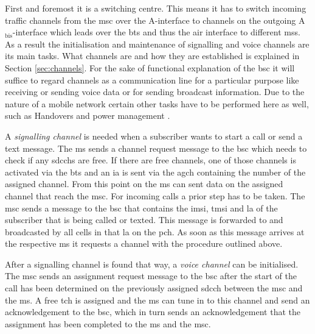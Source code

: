 First and foremost it is a switching centre.
This means it has to switch incoming traffic channels from the \gls{msc} over the A-interface to channels on the outgoing A$_\text{bis}$-interface which leads over the \gls{bts} and thus the air interface to different \glspl{ms}.
As a result the initialisation and maintenance of signalling and voice channels are its main tasks.
What channels are and how they are established is explained in Section \ref{sec:channels}.
For the sake of functional explanation of the \gls{bsc} it will suffice to regard channels as a communication line for a particular purpose like receiving or sending voice data or  for sending broadcast information.
Due to the nature of a mobile network certain other tasks have to be performed here as well, such as Handovers and power management \cite{kommsys2006}.

A \emph{signalling channel} is needed when a subscriber wants to start a call or send a text message.
The \gls{ms} sends a channel request message to the \gls{bsc} which needs to check if any \glspl{sdcch} are free.
If there are free channels, one of those channels is activated via the \gls{bts} and an \gls{ia} is sent via the \gls{agch} containing the number of the assigned channel.
From this point on the \gls{ms} can sent data on the assigned channel that reach the \gls{msc}.
For incoming calls a prior step has to be taken.
The \gls{msc} sends a message to the \gls{bsc} that contains the \gls{imsi}, \gls{tmsi} and \gls{la} of the subscriber that is being called or texted.
This message is forwarded to and broadcasted by all cells in that \gls{la} on the \gls{pch}.
As soon as this message arrives at the respective \gls{ms} it requests a channel with the procedure outlined above.

After a signalling channel is found that way, a \emph{voice channel} can be initialised.
The \gls{msc} sends an assignment request message to the \gls{bsc} after the start of the call has been determined on the previously assigned \gls{sdcch} between the \gls{msc} and the \gls{ms}.
A free \gls{tch} is assigned and the \gls{ms} can tune in to this channel and send an acknowledgement to the \gls{bsc}, which in turn sends an acknowledgement that the assignment has been completed to the \gls{ms} and the \gls{msc}.

